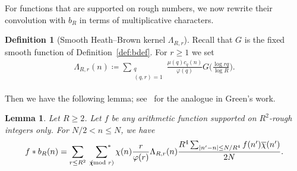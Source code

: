 \documentclass[12pt]{amsart}
\newtheorem{lemma}[theorem]{Lemma}
\theoremstyle{definition}
\newtheorem{definition}[theorem]{Definition}
\theoremstyle{remark}
\numberwithin{equation}{section}
\newcommand{\asum}{\sideset{}{^{\ast}}\sum}
\newcommand{\1}{\mathbf{1}}
\let\oldpmod\pmod
\renewcommand{\pmod}[1]{\hspace{-0.12cm}\oldpmod {#1}}
\begin{document}
For functions that are supported on rough numbers, we now rewrite their convolution with $b_R$ in terms of multiplicative characters.
\begin{definition}[Smooth Heath--Brown kernel $\Lambda_{R,r}$]\label{def:LRr}
Recall that $G$ is the fixed smooth function of Definition~\ref{def:bdef}. For $r\geq 1$ we set
\begin{align}\label{eq:LRrdef}
	\Lambda_{R,r}(n)\coloneqq \sum_{\substack{q\\ (q,r)=1}} \frac{\mu(q)c_q(n)}{\varphi(q)} G\bigl( \frac{\log rq}{\log R}\bigr).
\end{align}
\end{definition}
Then we have the following lemma; see~\cite[eq. (6.6)]{green-sarkozy} for the analogue in Green's work.
\begin{lemma}\label{lem:f*b} Let $R\geq 2$. Let $f$ be any arithmetic function supported on $R^2$-rough integers only. For $N/2<n\leq N$, we have
\begin{align}\label{eq:f*b}
    f*b_R(n)= \sum_{r\leq R^2}\,\,\,\asum_{ \chi\pmod r} \chi(n)\frac{r}{\varphi(r)} \Lambda_{R,r}(n) \frac{R^4\sum_{|n'-n|\leq N/R^4} f(n')\overline{\chi}(n')}{2N}.
\end{align}
\end{lemma}
\end{document}
